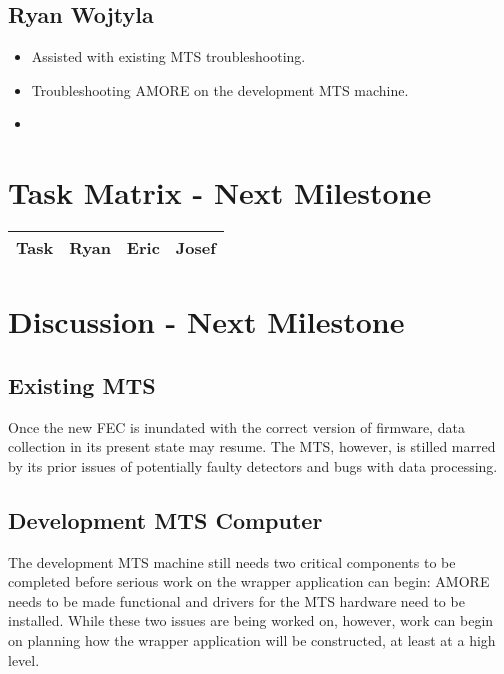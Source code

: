 \documentclass[12pt]{article}
\newcommand\tab[1][1cm]{\hspace*{#1}}
\begin{document}
\subsection{Ryan Wojtyla}

\begin{itemize}
\item Assisted with existing MTS troubleshooting.
\item Troubleshooting AMORE on the development MTS machine.
\item 
\end{itemize}

\section{Task Matrix - Next Milestone}

\begin{center}
  \begin{tabular}{|c|c|c|c|}
    \hline
    Task & Ryan & Eric & Josef \\
    \hline
    
    \hline
  \end{tabular}
\end{center}

\section{Discussion - Next Milestone}

\subsection{Existing MTS}

\tab Once the new FEC is inundated with the correct version of firmware, data
collection in its present state may resume. The MTS, however, is stilled marred
by its prior issues of potentially faulty detectors and bugs with data
processing.

\subsection{Development MTS Computer}

\tab The development MTS machine still needs two critical components to be
completed before serious work on the wrapper application can begin: AMORE needs
to be made functional and drivers for the MTS hardware need to be
installed. While these two issues are being worked on, however, work can begin
on planning how the wrapper application will be constructed, at least at a high
level.
\end{document}
